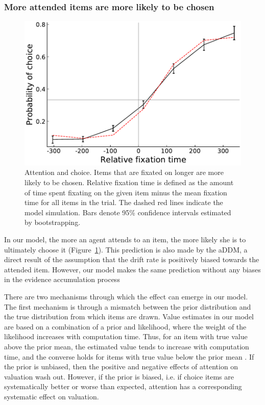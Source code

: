 \documentclass[12pt,a4paperpaper,]{article}
\begin{document}
\subsubsection{More attended items are more likely to be chosen}

\begin{figure}[tb]
  \centering
  \includegraphics[]{figs/fixation_bias.pdf}
  \caption{Attention and choice.
    Items that are fixated on longer are more likely to be chosen. Relative fixation time is defined as the amount of time spent fixating on the given item minus the mean fixation time for all items in the trial.
    The dashed red lines indicate the model simulation. Bars denote 95\% confidence intervals estimated by bootstrapping.
  }
  \label{fig:fixation_bias}
\end{figure}






In our model, the more an agent attends to an item, the more likely she is to ultimately choose it (Figure~\ref{fig:fixation_bias}). This prediction is also made by the aDDM, a direct result of the assumption that the drift rate is positively biased towards the attended item. However, our model makes the same prediction without any biases in the evidence accumulation process

There are two mechanisms through which the effect can emerge in our model. The first mechanism is through a mismatch between the prior distribution and the true distribution from which items are drawn. Value estimates in our model are based on a combination of a prior and likelihood, where the weight of the likelihood increases with computation time. Thus, for an item with true value above the prior mean, the estimated value tends to increase with computation time, and the converse holds for items with true value below the prior mean \citep{Armel2008}. If the prior is unbiased, then the positive and negative effects of attention on valuation wash out. However, if the prior is biased, i.e. if choice items are systematically better or worse than expected, attention has a corresponding systematic effect on valuation.
\end{document}
